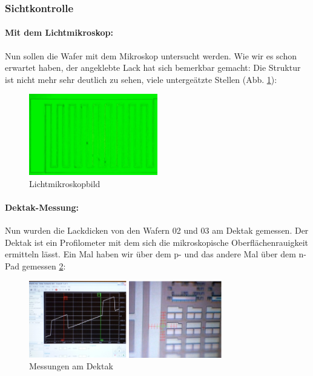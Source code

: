 \subsubsection[Sichtkontrolle]{Sichtkontrolle}

\paragraph[Mit dem Lichtmikroskop]{Mit dem Lichtmikroskop:}

Nun sollen die Wafer mit dem Mikroskop untersucht werden.
Wie wir es schon erwartet haben, der angeklebte Lack hat sich bemerkbar gemacht: Die Struktur ist nicht mehr sehr deutlich zu sehen, viele untergeätzte Stellen (Abb. \ref{fig:Mikroskopbild3}):

\begin{figure}[H]
    \centering
    \includegraphics[width=0.5\textwidth]{bilder/Mikroskopbild3.png}
  \caption{Lichtmikroskopbild}
  \label{fig:Mikroskopbild3}
\end{figure}


\paragraph[Dektak-Messung]{Dektak-Messung:}

Nun wurden die Lackdicken von den Wafern 02 und 03 am Dektak gemessen.
Der Dektak ist ein Profilometer mit dem sich die mikroskopische Oberflächenrauigkeit ermitteln lässt.
Ein Mal haben wir über dem p- und das andere Mal über dem n-Pad gemessen \ref{fig:MessungenamDektak}:


\begin{figure}[H]
    \centering
        \includegraphics[width=0.75\textwidth]{bilder/MessungenamDektak.png}
    \caption{Messungen am Dektak}
    \label{fig:MessungenamDektak}
\end{figure}


